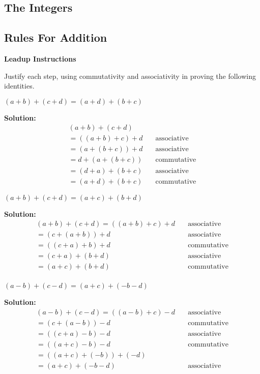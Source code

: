 \subsection{The Integers}
\subsection{Rules For Addition}

\textbf{Leadup Instructions}

Justify each step, using commutativity and associativity in proving the
following identities.

\begin{tcolorbox}[title=Problem 1, breakable]
$(a + b) + (c + d) = (a + d) + (b + c)$
\end{tcolorbox}

\textbf{Solution:}
\begin{align*}
(a + b) + (c + d) & \quad \text{} \\
=((a + b) + c) + d & \quad \text{associative} \\
=(a + (b + c)) + d & \quad \text{associative} \\
=d + (a + (b + c)) & \quad \text{commutative} \\
=(d + a) + (b + c) & \quad \text{associative} \\
=(a + d) + (b + c) & \quad \text{commutative}
\end{align*}


\begin{tcolorbox}[title=Problem 2, breakable]
$(a + b) + (c + d) = (a + c) + (b + d)$
\end{tcolorbox}

\textbf{Solution:}
\begin{align*}
(a + b) + (c + d) = ((a + b) + c) + d & \quad \text{associative} \\
=(c + (a + b)) + d & \quad \text{associative} \\
=((c + a) + b) + d & \quad \text{commutative} \\
=(c + a) + (b + d) & \quad \text{associative} \\
=(a + c) + (b + d) & \quad \text{commutative} \\
\end{align*}

\begin{tcolorbox}[title=Problem 3, breakable]
$(a - b) + (c - d) = (a + c) + (-b - d)$
\end{tcolorbox}

\textbf{Solution:}
\begin{align*}
(a - b) + (c - d) = ((a - b) + c) - d & \quad \text{associative} \\
=(c + (a - b)) - d & \quad \text{commutative} \\
=((c + a) - b) - d & \quad \text{associative} \\
=((a + c) - b) - d & \quad \text{commutative} \\
=((a + c) + (-b)) + (-d) & \quad \text{} \\
=(a + c) + (-b - d) & \quad \text{associative} \\
\end{align*}

